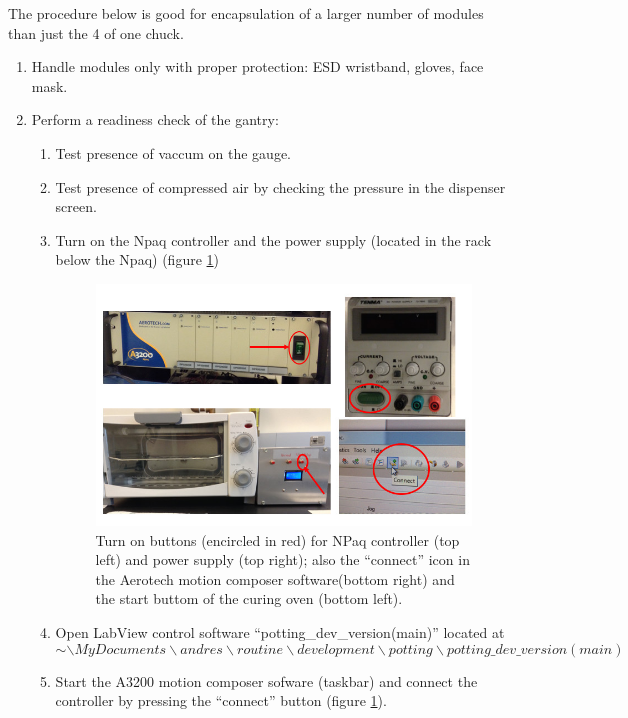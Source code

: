 \documentclass[12pt]{unlsilabsop}
\begin{document}
The procedure below is good for encapsulation of a larger number of modules than just the 4 of one chuck.
\begin{enumerate}
    \item Handle modules only with proper protection: ESD wristband, gloves, face mask.
    \item Perform a readiness check of the gantry:
    \begin{enumerate}
	\item Test presence of vaccum on the gauge.
	\item Test presence of compressed air by checking the pressure in the dispenser screen.
        \item Turn on the Npaq controller and the power supply (located in the rack below the Npaq) (figure \ref{turn_on})
          \begin{figure}[ht]
            \begin{center}
              \includegraphics[width=\textwidth]{img/turn_on.jpg}
              \caption{Turn on buttons (encircled in red) for NPaq controller (top left) and power supply (top right); also the ``connect'' icon in the Aerotech motion composer software(bottom right) and the start buttom of the curing oven (bottom left).}
              \label{turn_on}
            \end{center}
          \end{figure}
        \item Open LabView control software ``potting\_dev\_version(main)'' located at $$ \sim\backslash MyDocuments\backslash andres\backslash routine\backslash development\backslash potting \backslash potting\_dev\_version(main)$$
        \item Start the A3200 motion composer sofware (taskbar) and connect the controller by pressing the ``connect'' button  (figure \ref{turn_on}).

\end{enumerate}
\end{enumerate}
\end{document}
